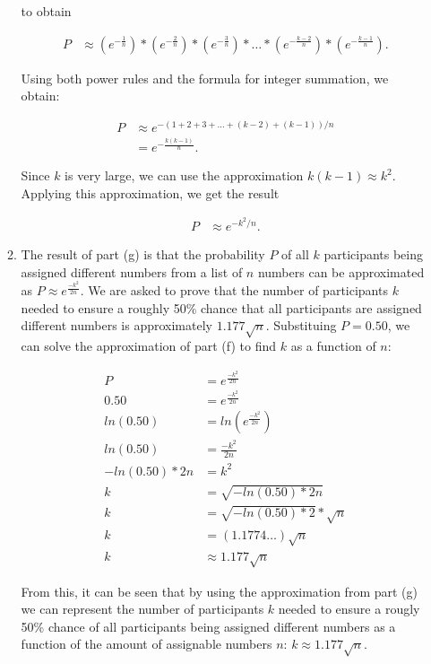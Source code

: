 \documentclass[11pt]{article}
\theoremstyle{definition}
\begin{document}
\begin{enumerate}
\begin{enumerate}
to obtain

\begin{align*}
P &\approx (e^{-\frac{1}{n}}) * (e^{-\frac{2}{n}}) * (e^{-\frac{3}{n}}) * \ldots * (e^{-\frac{k-2}{n}}) * (e^{-\frac{k-1}{n}}).
\end{align*}

Using both power rules and the formula for integer summation, we obtain:

\begin{align*}
P &\approx e^{-(1 + 2 + 3 + \ldots + (k - 2) + (k - 1)) / n}\\
&= e^{-\frac{k (k - 1)}{n}}.
\end{align*}

Since $k$ is very large, we can use the approximation $k (k - 1) \approx k^2$. Applying this approximation, we get the result

\begin{align*}
P &\approx e^{-k^2 / n}.
\end{align*}

\item The result of part (g) is that the probability $P$ of all $k$ participants being assigned different numbers from a list of $n$ numbers can be approximated as $P \approx e^{\frac{-k^2}{2n}}$. We are asked
to prove that the number of participants $k$ needed to ensure a roughly 50\% chance that all participants are assigned different numbers is approximately $1.177 \sqrt{n}$. Substituing $P = 0.50$, we can solve
the approximation of part (f) to find $k$ as a function of $n$:

\begin{align*}
P &=  e^{\frac{-k^2}{2n}}\\
0.50 &=  e^{\frac{-k^2}{2n}}\\
ln(0.50) &= ln( e^{\frac{-k^2}{2n}})\\
ln(0.50) &=  \frac{-k^2}{2n}\\
-ln(0.50) * 2n &= k^2\\
k  &= \sqrt{-ln(0.50) * 2n}\\
k &= \sqrt{-ln(0.50) * 2} * \sqrt{n}\\
k &= (1.1774 \ldots) \sqrt{n}\\
k &\approx 1.177 \sqrt{n}
\end{align*}

From this, it can be seen that by using the approximation from part (g) we can represent the number of participants $k$ needed to ensure a rougly 50\% chance of all participants being assigned different numbers
as a function of the amount of assignable numbers $n$: $k \approx 1.177 \sqrt{n}$.


\end{enumerate}
\end{enumerate}
\end{document}
